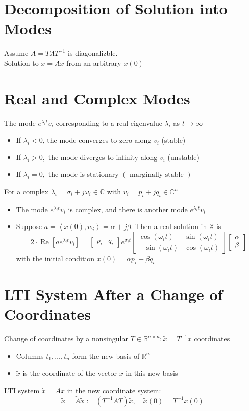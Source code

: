 \documentclass[10pt,a4paper,oneside]{article}
\begin{document}
\section{Decomposition of Solution into Modes}
Assume $A=T \Lambda T^{-1}$ is diagonalizble.\\
Solution to $\dot{x}=A x$ from an arbitrary $x(0)$
\section{Real and Complex Modes}
The mode $e^{\lambda_{i} t} v_{i}$ corresponding to a real eigenvalue $\lambda_{i}$ as $t \rightarrow \infty$
\begin{itemize}
\item If $\lambda_i<0$, the mode converges to zero along $v_i$ (stable)
\item If $\lambda_{i} > 0,$ the mode diverges to infinity along $v_{i}$ (unstable)
\item If $\lambda_{i}=0,$ the mode is stationary $(\text { marginally stable })$
\end{itemize}
For a complex $\lambda_{i}=\sigma_{i}+j \omega_{i} \in \mathbb{C}$ with $v_{i}=p_{i}+j q_{i} \in \mathbb{C}^{n}$
\begin{itemize}
\item The mode $e^{\lambda_{i} t} v_{i}$ is complex, and there is another mode $e^{\overline{\lambda}_{i} t} \overline{v}_{i}$
\item Suppose $a=\left\langle x(0), w_{i}\right\rangle=\alpha+ j \beta .$ Then a real solution in $\mathbb{X}$ is
\[
2 \cdot \operatorname{Re}\left[a e^{\lambda_{i} t} v_{i}\right]=\left[\begin{array}{cc}{p_{i}} & {q_{i}}\end{array}\right] e^{\sigma_{i} t}\left[\begin{array}{cc}{\cos \left(\omega_{i} t\right)} & {\sin \left(\omega_{i} t\right)} \\ {-\sin \left(\omega_{i} t\right)} & {\cos \left(\omega_{i} t\right)}\end{array}\right]\left[\begin{array}{l}{\alpha} \\ {\beta}\end{array}\right]
\]
with the initial condition $x(0)=\alpha p_{i}+\beta q_{i}$
\end{itemize}
\section{LTI System After a Change of Coordinates}
Change of coordinates by a nonsingular $T \in \mathbb{R}^{n \times n} : \tilde{x}=T^{-1} x$ coordinates
\begin{itemize}
\item Columns $t_{1}, \ldots, t_{n}$ form the new basis of $\mathbb{R}^{n}$
\item $\tilde{x}$ is the coordinate of the vector $x$ in this new basis
\end{itemize}
LTI system $\dot{x}=A x$ in the new coordinate system:
\[
\dot{\tilde{x}}=\tilde{A} \tilde{x} :=\left(T^{-1} A T\right) \tilde{x}, \quad \tilde{x}(0)=T^{-1} x(0)
\]
\end{document}
